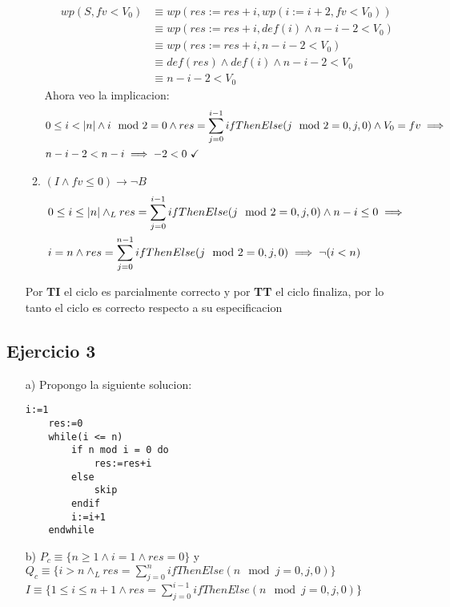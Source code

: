 \documentclass{article}
\begin{document}
\begin{itemize}
\begin{enumerate}
        \cont\begin{align}
            wp(S,fv<V_0)&\equiv wp(res:=res+i,wp(i:=i+2,fv<V_0))\\
            &\equiv wp(res:=res+i,def(i)\land n-i-2<V_0)\\
            &\equiv wp(res:=res+i,n-i-2<V_0)\\
            &\equiv def(res)\land def(i)\land n-i-2<V_0\\
            &\equiv n-i-2<V_0
        \end{align}
        Ahora veo la implicacion:
        \cont\begin{align}
            &\enRango{i}{n} \land i \mod 2=0 \land res= \sum\limits_{j=0}^{i-1}ifThenElse(j\mod 2=0,j,0)\land V_0=fv \implies\\
            &n-i-2<n-i \implies -2<0 \ \checkmark
        \end{align}
        
        \item $(I\land fv\leq0)\to \neg B$\\
        \cont\begin{align}
            &0\leq i \leq|n| \land_L res=\sum\limits_{j=0}^{i-1}ifThenElse(j\mod 2=0,j,0) \land n-i\leq0 \implies\\
            &i=n \land res=\sum\limits_{j=0}^{n-1}ifThenElse(j\mod 2=0,j,0) \implies \neg (i<n)
        \end{align}
    \end{enumerate}
    Por \textbf{TI} el ciclo es parcialmente correcto y por \textbf{TT} el ciclo finaliza, por lo tanto el ciclo es correcto respecto a su especificacion
\end{itemize}
\subsection*{Ejercicio 3}
\begin{itemize}
    \item [a) ]Propongo la siguiente solucion:
    \begin{lstlisting}[style=base]
    i:=1
    res:=0
    while(i <= n)
        if n mod i = 0 do
            res:=res+i
        else
            skip
        endif
        i:=i+1
    endwhile
    \end{lstlisting}
    \item [b) ] $P_c\equiv \{n\geq1 \land i=1 \land res=0\}$ y $Q_c\equiv\{i>n \land_L res=\sum\limits_{j=0}^{n}ifThenElse(n\mod j=0,j,0)\}$\\
    $I\equiv \{1\leq i\leq n+1 \land res=\sum\limits_{j=0}^{i-1}ifThenElse(n\mod j=0,j,0) \}$
\end{itemize}
\end{document}
